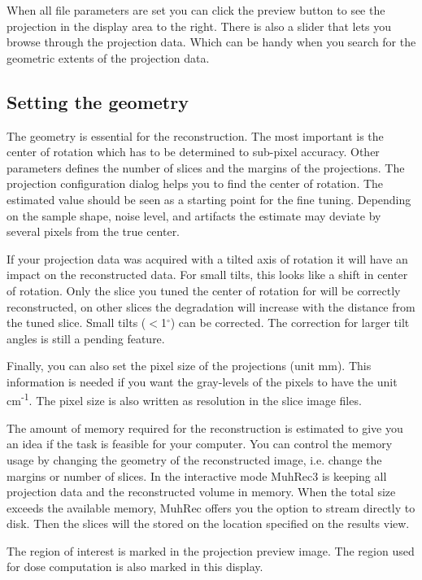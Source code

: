 \documentclass[a4paper]{scrreprt}
\begin{document}
When all file parameters are set you can click the preview button to see the projection in the display area to the right. There is also a slider that lets you browse through the projection data. Which can be handy when you search for the geometric extents of the projection data.

\subsection{Setting the geometry}
The geometry is essential for the reconstruction. The most important is the center of rotation which has to be determined to sub-pixel accuracy. Other parameters defines the number of slices and the margins of the projections. The projection configuration dialog helps you to find the center of rotation. The estimated value should be seen as a starting point for the fine tuning. Depending on the sample shape, noise level, and artifacts the estimate may deviate by several pixels from the true center. 

If your projection data was acquired with a tilted axis of rotation it will have an impact on the reconstructed data. For small tilts, this looks like a shift in center of rotation. Only the slice you tuned the center of rotation for will be correctly reconstructed, on other slices the degradation will increase with the distance from the tuned slice. 
Small tilts ($<$1$^{\circ}$) can be corrected. The correction for larger tilt angles is still a pending feature.

Finally, you can also set the pixel size of the projections (unit mm). This information is needed if you want the gray-levels of the pixels to have the unit cm\textsuperscript{-1}. The pixel size is also written as resolution in the slice image files.

The amount of memory required for the reconstruction is estimated to give you an idea if the task is feasible for your computer. You can control the memory usage by changing the geometry of the reconstructed image, i.e. change the margins or number of slices. In the interactive mode MuhRec3 is keeping all projection data and the reconstructed volume in memory. When the total size exceeds the available memory, MuhRec offers you the option to stream directly to disk. Then the slices will the stored on the location specified on the results view.


The region of interest is marked in the projection preview image. The region used for dose computation is also marked in this display.
\end{document}
